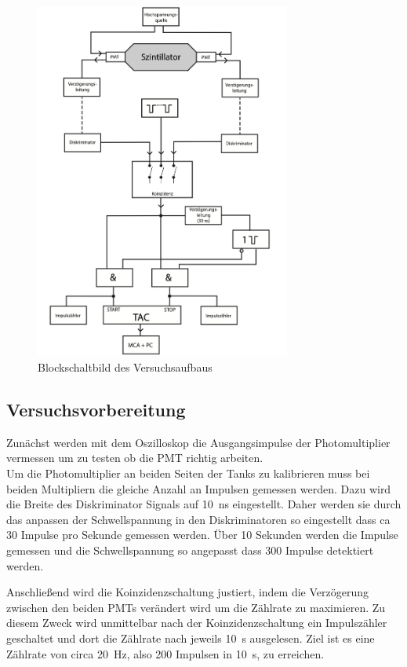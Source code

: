 \begin{figure}[H]
    \centering
    \includegraphics[width = 0.75\textwidth]{./bilder/Schaltbild.png}
    \caption{Blockschaltbild des Versuchsaufbaus \cite{anleitung}}
    \label{fig:schaltbild}
\end{figure}
\subsection{Versuchsvorbereitung}
Zunächst werden mit dem Oszilloskop die Ausgangsimpulse der Photomultiplier vermessen um zu testen ob die PMT richtig arbeiten.\\
Um die Photomultiplier an beiden Seiten der Tanks zu kalibrieren muss bei beiden Multipliern die gleiche Anzahl an Impulsen gemessen werden.
Dazu wird die Breite des Diskriminator Signals auf \SI{10}{\nano\second} eingestellt.
Daher werden sie durch das anpassen der Schwellspannung in den Diskriminatoren so eingestellt dass ca 30 Impulse pro Sekunde gemessen werden.
Über 10 Sekunden werden die Impulse gemessen und die Schwellspannung so angepasst dass 300 Impulse detektiert werden.

Anschließend wird die Koinzidenzschaltung justiert, indem die Verzögerung zwischen den beiden PMTs verändert wird um die Zählrate zu maximieren.
Zu diesem Zweck wird unmittelbar nach der Koinzidenzschaltung ein Impulszähler geschaltet und dort die Zählrate nach jeweils \SI{10}{\second} ausgelesen.
Ziel ist es eine Zählrate von circa \SI{20}{\hertz}, also \num{200} Impulsen in \SI{10}{\second}, zu erreichen.


